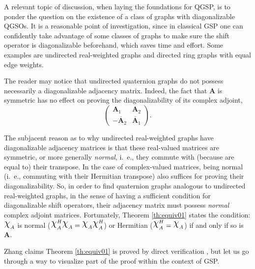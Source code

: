 A relevant topic of discussion, when laying the foundations for QGSP, is to ponder the question on the existence of a class of graphs with diagonalizable QGSOs. It is a reasonable point of investigation, since in classical GSP one can confidently take advantage of some classes of graphs to make sure the shift operator is diagonalizable beforehand, which saves time and effort. Some examples are undirected real-weighted graphs and directed ring graphs with equal edge weights.

The reader may notice that undirected quaternion graphs do not possess necessarily a diagonalizable adjacency matrix. Indeed, the fact that $\mathbf{A}$ is symmetric has no effect on proving the diagonalizability of its complex adjoint,
\begin{equation}
    \begin{pmatrix}
        \mathbf{A}_1              & \mathbf{A}_2            \\
        - \overline{\mathbf{A}}_2 & \overline{\mathbf{A}}_1
    \end{pmatrix}.
\end{equation}

The subjacent reason as to why undirected real-weighted graphs have diagonalizable adjacency matrices is that these real-valued matrices are symmetric, or more generally \textit{normal}, i.~e., they commute with (because are equal to) their transpose. In the case of complex-valued matrices, being normal (i.~e., commuting with their Hermitian transpose) also suffices for proving their diagonalizability. So, in order to find quaternion graphs analogous to undirected real-weighted graphs, in the sense of having a sufficient condition for diagonalizable shift operators, their adjacency matrix must possess \textit{normal} complex adjoint matrices. Fortunately, Theorem \ref{th:equiv01} states the condition:
$ \rchi_{A}$ is normal ($ \rchi_{A}^H \rchi_{A} = \rchi_{A} \rchi_{A}^H $) or Hermitian ($\rchi_{A}^H = \rchi_{A}$) if and only if so is $ \mathbf{A}$.

Zhang claims Theorem \ref{th:equiv01} is proved by direct verification \cite{zhang1997quaternions}, but let us go through a way to visualize part of the proof within the context of GSP.

